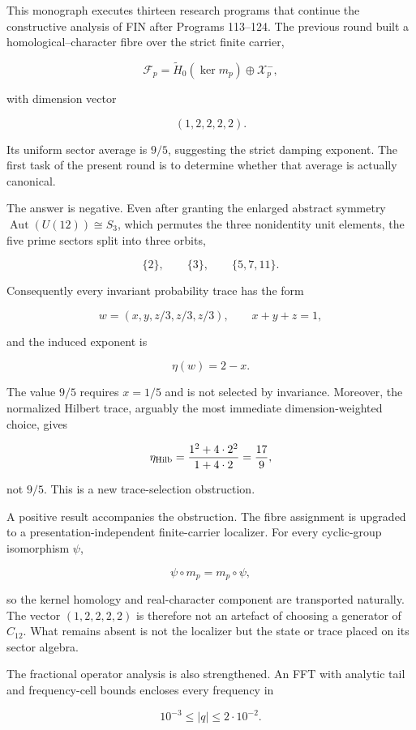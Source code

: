 \documentclass[11pt,a4paper,openany]{report}
\begin{document}
This monograph executes thirteen research programs that continue the constructive analysis of FIN after Programs 113--124. The previous round built a homological--character fibre over the strict finite carrier,

\[
\mathcal F_p
=
\widetilde H_0(\ker m_p)\oplus\mathcal X_p^-,
\]

with dimension vector

\[
(1,2,2,2,2).
\]

Its uniform sector average is \(9/5\), suggesting the strict damping exponent. The first task of the present round is to determine whether that average is actually canonical.

The answer is negative. Even after granting the enlarged abstract symmetry \(\operatorname{Aut}(U(12))\cong S_3\), which permutes the three nonidentity unit elements, the five prime sectors split into three orbits,

\[
\{2\},\qquad \{3\},\qquad \{5,7,11\}.
\]

Consequently every invariant probability trace has the form

\[
w=(x,y,z/3,z/3,z/3),
\qquad x+y+z=1,
\]

and the induced exponent is

\[
\eta(w)=2-x.
\]

The value \(9/5\) requires \(x=1/5\) and is not selected by invariance. Moreover, the normalized Hilbert trace, arguably the most immediate dimension-weighted choice, gives

\[
\eta_{\rm Hilb}
=
\frac{1^2+4\cdot2^2}{1+4\cdot2}
=\frac{17}{9},
\]

not \(9/5\). This is a new trace-selection obstruction.

A positive result accompanies the obstruction. The fibre assignment is upgraded to a presentation-independent finite-carrier localizer. For every cyclic-group isomorphism \(\psi\),

\[
\psi\circ m_p=m_p\circ\psi,
\]

so the kernel homology and real-character component are transported naturally. The vector \((1,2,2,2,2)\) is therefore not an artefact of choosing a generator of \(C_{12}\). What remains absent is not the localizer but the state or trace placed on its sector algebra.

The fractional operator analysis is also strengthened. An FFT with analytic tail and frequency-cell bounds encloses every frequency in

\[
10^{-3}\le |q|\le2\cdot10^{-2}.
\]
\end{document}
